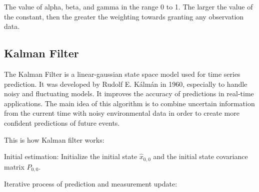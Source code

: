 \documentclass[conference]{IEEEtran}
\begin{document}
The value of alpha, beta, and gamma in the range 0 to 1. The larger the value of the constant, then the greater the weighting towards granting any observation data.
\subsection{Kalman Filter}

The Kalman Filter is a linear-gaussian state space model used for time series prediction. It was developed by Rudolf E. Kálmán in 1960, especially to handle noisy and fluctuating models. It improves the accuracy of predictions in real-time applications. The main idea of this algorithm is to combine uncertain information from the current time with noisy environmental data in order to create more confident predictions of future events.

This is how Kalman filter works:

Initial estimation: Initialize the initial state $\widehat{x}_{0,0}$ and the initial state covariance matrix $P_{0,0}$.

Iterative process of prediction and measurement update:
\end{document}
